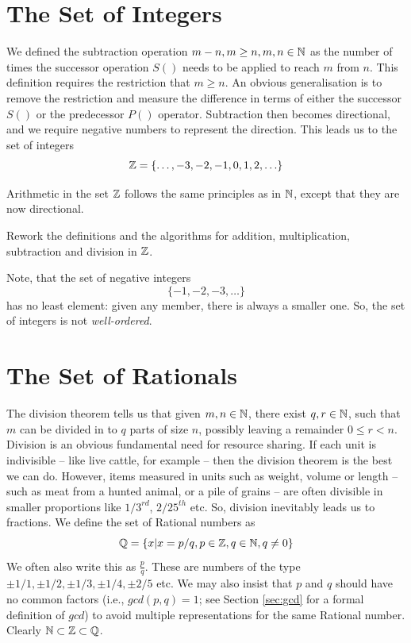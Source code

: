 \section{The Set of Integers}
\label{sec:int}
 
We defined  the subtraction operation $m-n, m \geq n, m,n \in \mathbb{N}$ as the number of times the successor operation $S()$ needs to be applied to reach $m$ from $n$. This definition requires the restriction that $m \geq n$. An obvious generalisation is to remove the restriction and measure the difference in terms of either the successor $S()$ or the predecessor $P()$ operator. Subtraction then becomes directional, and we require negative numbers to represent the direction. This leads us to the set of integers
\[
\mathbb{Z} = \{\ldots, -3,-2,-1,0,1,2,\ldots\}
\]

Arithmetic in the set $\mathbb{Z}$ follows the same principles as in $\mathbb{N}$, except that they are now directional.
\begin{exercise}
Rework the definitions and the algorithms for addition, multiplication, subtraction and division in $\mathbb{Z}$.
\end{exercise}

Note, that the set of negative integers
\[
\{-1,-2,-3,\ldots\}
\]
has no least element: given any member, there is always a smaller one. So, the set of  integers is not {\em well-ordered}.

\section{The Set of Rationals}
\label{sec:rat}
The division theorem tells us that given $m,n \in \mathbb{N}$, there exist $q,r \in \mathbb{N}$, such that $m$ can be divided in to $q$ parts of size $n$, possibly leaving a remainder $0 \leq r < n$. Division is an obvious fundamental need for resource sharing. If each unit is indivisible -- like live cattle, for example --  then the division theorem is the best we can do. However, items measured in units such as weight, volume or length --  such as meat from a hunted animal, or a pile of grains -- are often divisible in smaller proportions like $1/3^{rd}$, $2/25^{th}$ etc.  So, division inevitably leads us to fractions. We define the set of Rational numbers as
\[
\mathbb{Q} = \{x | x = p/q, p \in \mathbb{Z}, q \in \mathbb{N}, q \neq 0\}
\]
We often also write this as $\frac{p}{q}$. These are numbers of the type $\pm 1/1,\pm 1/2,\pm 1/3,\pm 1/4, \pm 2/5$ etc.  We may also insist that $p$ and $q$ should have no common factors (i.e., $gcd(p,q) = 1$;  see Section \ref{sec:gcd} for a formal definition of $gcd$) to avoid multiple representations for the same Rational number. Clearly $\mathbb{N} \subset \mathbb{Z} \subset \mathbb{Q}$.  

